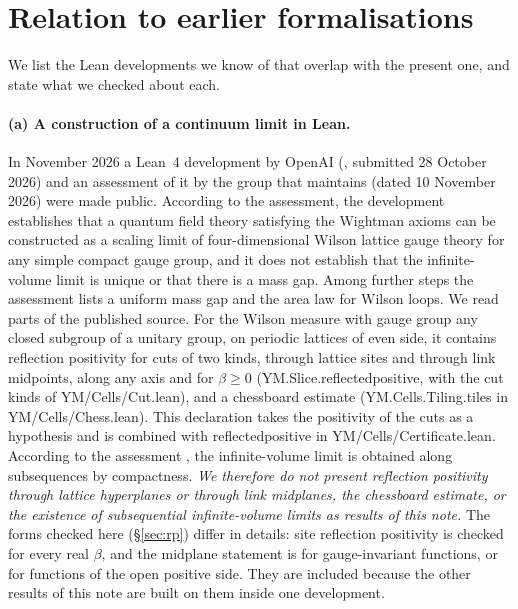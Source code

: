 \documentclass[11pt,a4paper]{article}
\theoremstyle{definition}
\theoremstyle{remark}
\newcommand{\leanus}{\textunderscore\allowbreak{}}
\newcommand{\leandot}{.\allowbreak{}}
\newcommand{\leansl}{/\allowbreak{}}
\newcommand{\lean}[1]{{\ttfamily\let\_\leanus #1}}
\begin{document}
\section{Relation to earlier formalisations}\label{sec:prior}

We list the Lean developments we know of that overlap with the present one, and state what we checked about each.

\paragraph{(a) A construction of a continuum limit in Lean.}
In November 2026 a Lean~4 development by OpenAI (\cite{OAI}, submitted 28 October 2026) and an assessment of it by the group that maintains \cite{YMG} (dated 10 November 2026) were made public. According to the assessment, the development establishes that a quantum field theory satisfying the Wightman axioms can be constructed as a scaling limit of four-dimensional Wilson lattice gauge theory for any simple compact gauge group, and it does not establish that the infinite-volume limit is unique or that there is a mass gap. Among further steps the assessment lists a uniform mass gap and the area law for Wilson loops. We read parts of the published source. For the Wilson measure with gauge group any closed subgroup of a unitary group, on periodic lattices of even side, it contains reflection positivity for cuts of two kinds, through lattice sites and through link midpoints, along any axis and for $\beta\ge0$ (\lean{YM\leandot{}Slice\leandot{}reflected\_positive}, with the cut kinds of \lean{YM\leansl{}Cells\leansl{}Cut\leandot{}lean}), and a chessboard estimate (\lean{YM\leandot{}Cells\leandot{}Tiling\leandot{}tiles} in \lean{YM\leansl{}Cells\leansl{}Chess\leandot{}lean}). This declaration takes the positivity of the cuts as a hypothesis and is combined with \lean{reflected\_positive} in \lean{YM\leansl{}Cells\leansl{}Certificate\leandot{}lean}. According to the assessment \cite{YMG}, the infinite-volume limit is obtained along subsequences by compactness. \emph{We therefore do not present reflection positivity through lattice hyperplanes or through link midplanes, the chessboard estimate, or the existence of subsequential infinite-volume limits as results of this note.} The forms checked here (\S\ref{sec:rp}) differ in details: site reflection positivity is checked for every real $\beta$, and the midplane statement is for gauge-invariant functions, or for functions of the open positive side. They are included because the other results of this note are built on them inside one development.
\end{document}
